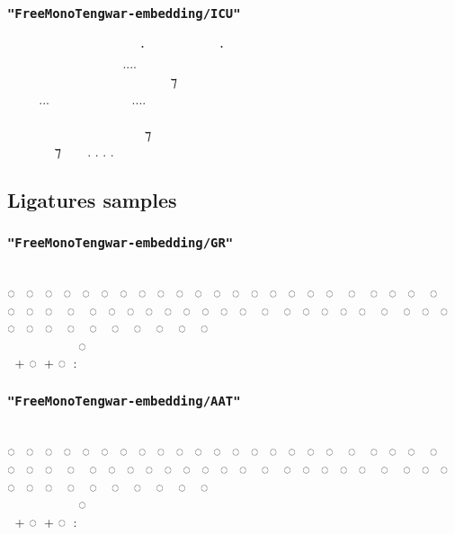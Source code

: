\documentclass[11pt,a4paper]{article}
\begin{document}
\subsubsection*{\texttt{"FreeMonoTengwar-embedding/ICU"}}

\embedICU
  ‍   ⸱‍  ‍ ⸱ \\
    ‍....  ‍  \\
  ‍   ‍ ‍ ⁊ ‍  \\
...  ....   \\
         ‍ \\
 ‍ ‍‍   ⁊  ‍ ‍ \\
 ‍ ⁊  . . . . \normalfont


\newpage

\subsection{Ligatures samples}

\subsubsection*{\texttt{"FreeMonoTengwar-embedding/GR"}}

\embedGR
                          \\
◌ ◌ ◌ ◌ ◌ ◌ ◌ ◌ ◌ ◌ ◌ ◌ ◌ ◌ ◌ ◌ ◌ ◌ ◌ ◌ ◌ ◌ ◌ ◌ ◌ ◌ ◌ ◌ ◌ ◌ ◌ ◌ ◌ ◌ ◌ ◌ ◌ ◌ ◌ ◌ ◌ ◌ ◌ ◌ ◌ ◌ ◌ ◌ ◌ ◌ ◌ ◌ ◌ ◌ ◌ ◌\\
      ◌‍ ‍ ‍ ‍ \\
 \normalfont + \embedGR ◌ \normalfont + \embedGR ◌ : 

\subsubsection*{\texttt{"FreeMonoTengwar-embedding/AAT"}}

\embedAAT
                          \\
◌ ◌ ◌ ◌ ◌ ◌ ◌ ◌ ◌ ◌ ◌ ◌ ◌ ◌ ◌ ◌ ◌ ◌ ◌ ◌ ◌ ◌ ◌ ◌ ◌ ◌ ◌ ◌ ◌ ◌ ◌ ◌ ◌ ◌ ◌ ◌ ◌ ◌ ◌ ◌ ◌ ◌ ◌ ◌ ◌ ◌ ◌ ◌ ◌ ◌ ◌ ◌ ◌ ◌ ◌ ◌\\
      ◌‍ ‍ ‍ ‍ \\
 \normalfont + \embedAAT ◌ \normalfont + \embedAAT ◌ : 
\end{document}
